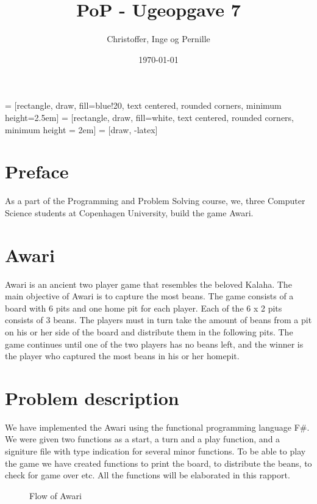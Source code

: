 \documentclass[a4paper]{report}
\title{PoP - Ugeopgave 7}
\author{Christoffer, Inge og Pernille}
\date{\today}
\begin{document}
\maketitle
{} = [rectangle, draw, fill=blue!20, text centered,
    rounded corners, minimum height=2.5em]
 = [rectangle, draw, fill=white, text centered,
    rounded corners, minimum height = 2em]
 = [draw, -latex]

\section*{Preface}
As a part of the Programming and Problem Solving course, we,
three Computer Science students at Copenhagen University, build the game Awari.

\section*{Awari}
Awari is an ancient two player game that resembles the beloved Kalaha. The main
objective of Awari is to capture the most beans. The game consists of a board
with 6 pits and one home pit for each player. Each of the 6 x 2 pits consists of
3 beans. The players must in turn take the amount of beans from a pit on his or
her side of the board and distribute them in the following pits. The game
continues until one of the two players has no beans left, and the winner is the
player who captured the most beans in his or her homepit.

\section*{Problem description}
We have implemented the Awari using the functional programming language F\#. We
were given two functions as a start, a turn and a play function, and a signiture
file with type indication for several minor functions. To be able to play the
game we have created functions to print the board, to distribute the beans, to
check for game over etc. All the functions will be elaborated in this rapport.

\begin{figure}
\centering
{}
\caption{Flow of Awari}
\label{fig:gameflow}
\end{figure}
\end{document}
